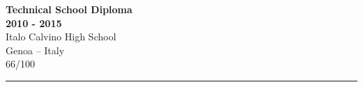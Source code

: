 \documentclass[a4paper,10pt]{article}
\newcommand{\MyVerticalRule}{%
	\textcolor{ColorOne}{\rule{1pt}{\textheight}}
}
\begin{document}
\begin{adjustbox}{valign=t}
\begin{minipage}{0.3\textwidth}
\begin{description}
	\item \textcolor{ColorOne}{\textbf{Technical School Diploma}}\\
	\textbf{2010 - 2015}\\
	Italo Calvino High School\\
	Genoa -- Italy\\
	66/100
\end{description}

\vfill


\end{minipage}
\end{adjustbox}
%
%
%
\hfill
\begin{adjustbox}{valign=t}
\begin{minipage}{0.05\textwidth} %
\MyVerticalRule  %
\end{minipage}
\end{adjustbox}
\hfill
%
\end{document}
